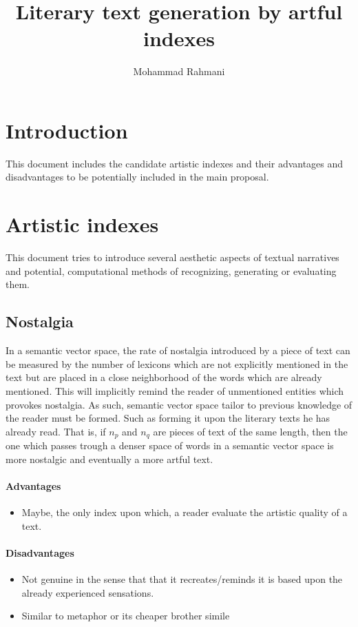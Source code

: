 \documentclass{article}
\begin{document}
	
	\title{Literary text generation by artful indexes}
	\author{Mohammad Rahmani}
	\date{}
	\maketitle
		
		\section{Introduction} \label{sec:introduction}
		This document includes the candidate artistic indexes and their advantages and disadvantages to be potentially included in the main proposal.
		\section{Artistic indexes} \label{sec:artistic-indexes}
		This document tries to introduce several aesthetic aspects of textual narratives and potential, computational methods of recognizing, generating or evaluating them. 
			
			\subsection{Nostalgia} 
			In a semantic vector space, the rate of nostalgia introduced by a piece of text can be measured by the number of lexicons which are not explicitly mentioned in the text but are placed in a close neighborhood of the words which are already mentioned. This will implicitly remind the reader of unmentioned entities which provokes nostalgia. As such, semantic vector space tailor to previous knowledge of the reader must be formed. Such as forming it upon the literary texts he has already read. That is, if $n_p$ and $n_q$ are pieces of text of the same length, then the one which passes trough a denser space of words in a semantic vector space is more nostalgic and eventually a more artful text.
				\paragraph{Advantages}
					\begin{itemize}
						\item Maybe, the only index upon which, a reader evaluate the artistic quality of a text.
					\end{itemize}
				\paragraph{Disadvantages}
					\begin{itemize}
						\item Not genuine in the sense that that it recreates/reminds it is based upon the already experienced sensations. 
						\item Similar to metaphor or its cheaper brother simile    
					\end{itemize}
\end{document}
